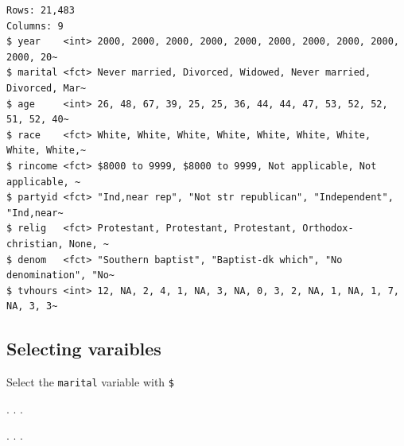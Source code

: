 \documentclass[
  letterpaper,
  DIV=11,
  numbers=noendperiod,
  oneside]{scrartcl}
\newenvironment{Shaded}{\begin{snugshade}}{\end{snugshade}}
\newcommand{\NormalTok}[1]{\textcolor[rgb]{0.00,0.23,0.31}{#1}}
\newcommand{\SpecialCharTok}[1]{\textcolor[rgb]{0.37,0.37,0.37}{#1}}
\begin{document}
\begin{verbatim}
Rows: 21,483
Columns: 9
$ year    <int> 2000, 2000, 2000, 2000, 2000, 2000, 2000, 2000, 2000, 2000, 20~
$ marital <fct> Never married, Divorced, Widowed, Never married, Divorced, Mar~
$ age     <int> 26, 48, 67, 39, 25, 25, 36, 44, 44, 47, 53, 52, 52, 51, 52, 40~
$ race    <fct> White, White, White, White, White, White, White, White, White,~
$ rincome <fct> $8000 to 9999, $8000 to 9999, Not applicable, Not applicable, ~
$ partyid <fct> "Ind,near rep", "Not str republican", "Independent", "Ind,near~
$ relig   <fct> Protestant, Protestant, Protestant, Orthodox-christian, None, ~
$ denom   <fct> "Southern baptist", "Baptist-dk which", "No denomination", "No~
$ tvhours <int> 12, NA, 2, 4, 1, NA, 3, NA, 0, 3, 2, NA, 1, NA, 1, 7, NA, 3, 3~
\end{verbatim}

\hypertarget{selecting-varaibles}{%
\subsection{Selecting varaibles}\label{selecting-varaibles}}

Select the \texttt{marital} variable with \texttt{\$}

. . .

\begin{Shaded}
\end{Shaded}

. . .
\end{document}

